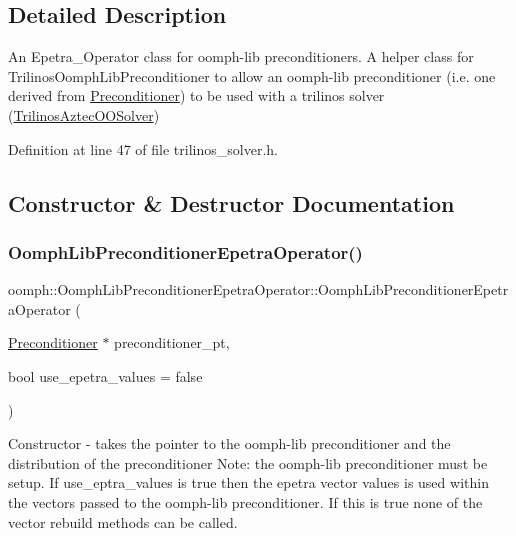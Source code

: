 \subsection{Detailed Description}
An Epetra\+\_\+\+Operator class for oomph-\/lib preconditioners. A helper class for Trilinos\+Oomph\+Lib\+Preconditioner to allow an oomph-\/lib preconditioner (i.\+e. one derived from \hyperlink{classoomph_1_1Preconditioner}{Preconditioner}) to be used with a trilinos solver (\hyperlink{classoomph_1_1TrilinosAztecOOSolver}{Trilinos\+Aztec\+O\+O\+Solver}) 

Definition at line 47 of file trilinos\+\_\+solver.\+h.



\subsection{Constructor \& Destructor Documentation}
\mbox{\label{classoomph_1_1OomphLibPreconditionerEpetraOperator_ac32c701f4fb54f65e2701b984f41ada3}} 
\subsubsection{\texorpdfstring{Oomph\+Lib\+Preconditioner\+Epetra\+Operator()}{OomphLibPreconditionerEpetraOperator()}\hspace{0.1cm}{\footnotesize\ttfamily [1/2]}}
{\footnotesize\ttfamily oomph\+::\+Oomph\+Lib\+Preconditioner\+Epetra\+Operator\+::\+Oomph\+Lib\+Preconditioner\+Epetra\+Operator (\begin{DoxyParamCaption}\item[{\hyperlink{classoomph_1_1Preconditioner}{Preconditioner} $\ast$}]{preconditioner\+\_\+pt,  }\item[{bool}]{use\+\_\+epetra\+\_\+values = {\ttfamily false} }\end{DoxyParamCaption})\hspace{0.3cm}{\ttfamily [inline]}}



Constructor -\/ takes the pointer to the oomph-\/lib preconditioner and the distribution of the preconditioner Note\+: the oomph-\/lib preconditioner must be setup. If use\+\_\+eptra\+\_\+values is true then the epetra vector values is used within the vectors passed to the oomph-\/lib preconditioner. If this is true none of the vector rebuild methods can be called. 

